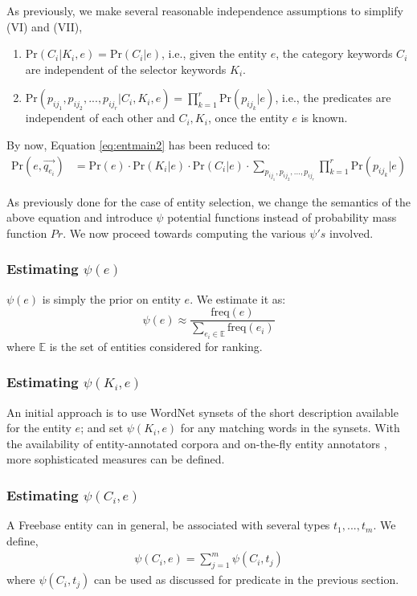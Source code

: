 \documentclass[a4paper, twoside, 12pt]{report}
\begin{document}
As previously, we make several reasonable independence assumptions to simplify (VI) and (VII),
\begin{enumerate}
\item $\text{Pr}(C_i|K_i,e) = \text{Pr}(C_i|e)$, i.e., given the entity $e$, the category keywords $C_i$ are independent of the selector keywords $K_i$.

\item $\text{Pr}(p_{ij_1}, p_{ij_2},..., p_{ij_r} | C_i, K_i, e) = \prod_{k=1}^{r} \text{Pr}(p_{ij_k} | e)$, i.e., the predicates are independent of each other and $C_i, K_i$, once the entity $e$ is known.
\end{enumerate}

By now, Equation \ref{eq:entmain2} has been reduced to:
\begin{align}
\text{Pr}(e, \vec{q_{e_i}}) &= \text{Pr}(e) \cdot \text{Pr}(K_i | e) \cdot \text{Pr}(C_i | e) \cdot \sum_{p_{ij_1}, p_{ij_2},..., p_{ij_r}}  \prod_{k=1}^{r} \text{Pr}(p_{ij_k} | e) \label{eq:entmain3}
\end{align}

As previously done for the case of entity selection, we change the semantics of the above equation and introduce $\psi$ potential functions instead of probability mass function $Pr$. We now proceed towards computing the various $\psi's$ involved.

\subsubsection{Estimating $\psi(e)$}
$\psi(e)$ is simply the prior on entity $e$. We estimate it as:
$$\psi(e) \approx \frac{\text{freq}(e)}{\sum_{e_i \in \mathbb{E}}\text{freq}(e_i)}$$
where $\mathbb{E}$ is the set of entities considered for ranking.

\subsubsection{Estimating $\psi(K_i, e)$}
An initial approach is to use WordNet synsets of the short description available for the entity $e$; and set $\psi(K_i, e)$ for any matching words in the synsets. With the availability of entity-annotated corpora and on-the-fly entity annotators \cite{ferragina2010tagme}, more sophisticated measures can be defined.

\subsubsection{Estimating $\psi(C_i, e)$}
A Freebase entity can in general, be associated with several types $t_1, ..., t_m$. We define,
\begin{align}
 \psi(C_i, e) = \sum_{j=1}^{m} \psi(C_i, t_j)
\end{align}
where $\psi(C_i, t_j)$ can be used as discussed for predicate in the previous section.
\end{document}
